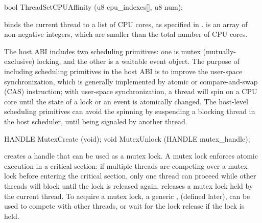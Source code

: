 \begin{paldef}
bool ThreadSetCPUAffinity (u8 cpu_indexes[], u8 num);
\end{paldef}

 binds the current thread to a list of CPU cores, as specified in .
 is an array of non-negative integers, which are smaller than the total number of CPU cores.





The host ABI includes two scheduling primitives: one is mutex (mutually-exclusive) locking, and the other is a waitable event object.
The purpose of including scheduling primitives in the host ABI
is to improve the user-space synchronization, which is generally implemented
by atomic or compare-and-swap (CAS) instruction;
with user-space synchronization, a thread will spin on a CPU core until the state of a lock or an event
is atomically changed.
The host-level scheduling primitives
can avoid the spinning
by suspending a blocking thread in the host scheduler,
until being signaled by another thread.








\begin{paldef}
HANDLE MutexCreate (void);
void   MutexUnlock (HANDLE mutex_handle);
\end{paldef}


 creates a handle that can be used as a mutex lock.
A mutex lock enforces atomic execution in a critical section:
if multiple threads are competing over a mutex lock
before entering the critical section,
only one thread can proceed while other threads will block until the lock is released again.
 releases a mutex lock held
by the current thread.
To acquire a mutex lock,
a generic \hostapi{},
 (defined later),
can be used to compete with other threads,
or wait for the lock release if the lock is held.



